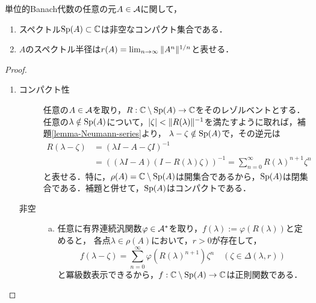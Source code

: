 \documentclass[uplatex,dvipdfmx]{jsreport}
\begin{document}
\begin{theorem}\label{thm-Spectrum-is-compact}
    単位的Banach代数の任意の元$A\in\mathcal{A}$に関して，
    \begin{enumerate}
        \item スペクトル$\mathrm{Sp}(A)\subset\mathbb{C}$は非空なコンパクト集合である．
        \item $A$のスペクトル半径は$r(A)=\lim_{n\to\infty}\|A^n\|^{1/n}$と表せる．
    \end{enumerate}
\end{theorem}
\begin{proof}\mbox{}
    \begin{enumerate}
        \item 
        \begin{description}
            \item[コンパクト性] 任意の$A\in\mathcal{A}$を取り，$R:\mathbb{C}\setminus\mathrm{Sp}(A)\to\mathbb{C}$をそのレゾルベントとする．
            任意の$\lambda\notin\mathrm{Sp}(A)$について，$\lvert\zeta\rvert<\|R(\lambda)\|^{-1}$を満たすように取れば，補題\ref{lemma-Neumann-series}より，
            $\lambda-\zeta\notin\mathrm{Sp}(A)$で，その逆元は
            \begin{align*}
                R(\lambda-\zeta)&=(\lambda I-A-\zeta I)^{-1}\\
                &=((\lambda I-A)(I-R(\lambda)\zeta))^{-1}=\sum^\infty_{n=0}R(\lambda)^{n+1}\zeta^n
            \end{align*}
            と表せる．特に，$\rho(A)=\mathbb{C}\setminus\mathrm{Sp}(A)$は開集合であるから，$\mathrm{Sp}(A)$は閉集合である．補題と併せて，$\mathrm{Sp}(A)$はコンパクトである．
            \item[非空]
            \begin{enumerate}[(a)]
                \item 任意に有界連続汎関数$\varphi\in\mathcal{A}^*$を取り，$f(\lambda):=\varphi(R(\lambda))$と定めると，
                各点$\lambda\in\rho(A)$において，$r>0$が存在して，
                \[f(\lambda-\zeta)=\sum^\infty_{n=0}\varphi(R(\lambda)^{n+1})\zeta^n\quad(\zeta\in\Delta(\lambda,r))\]
                と冪級数表示できるから，$f:\mathbb{C}\setminus\mathrm{Sp}(A)\to\mathbb{C}$は正則関数である．


\end{enumerate}
\end{description}
\end{enumerate}
\end{proof}
\end{document}
